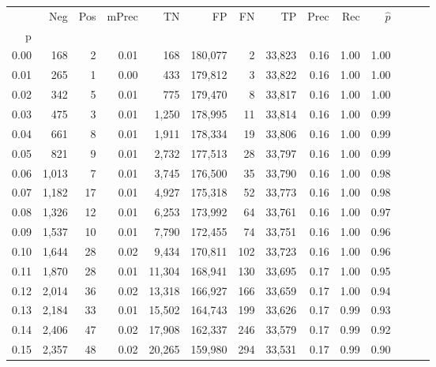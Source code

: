 \begin{tabular}{rrrrrrrrrrrrrr}
\toprule
{} &    Neg &  Pos & mPrec &       TN &       FP &      FN &      TP &  Prec &   Rec & $\hat{p}$ \\
p    &        &      &       &          &          &         &         &       &       &           \\
\midrule
0.00 &    168 &    2 &  0.01 &      168 &  180,077 &       2 &  33,823 &  0.16 &  1.00 &      1.00 \\
0.01 &    265 &    1 &  0.00 &      433 &  179,812 &       3 &  33,822 &  0.16 &  1.00 &      1.00 \\
0.02 &    342 &    5 &  0.01 &      775 &  179,470 &       8 &  33,817 &  0.16 &  1.00 &      1.00 \\
0.03 &    475 &    3 &  0.01 &    1,250 &  178,995 &      11 &  33,814 &  0.16 &  1.00 &      0.99 \\
0.04 &    661 &    8 &  0.01 &    1,911 &  178,334 &      19 &  33,806 &  0.16 &  1.00 &      0.99 \\
0.05 &    821 &    9 &  0.01 &    2,732 &  177,513 &      28 &  33,797 &  0.16 &  1.00 &      0.99 \\
0.06 &  1,013 &    7 &  0.01 &    3,745 &  176,500 &      35 &  33,790 &  0.16 &  1.00 &      0.98 \\
0.07 &  1,182 &   17 &  0.01 &    4,927 &  175,318 &      52 &  33,773 &  0.16 &  1.00 &      0.98 \\
0.08 &  1,326 &   12 &  0.01 &    6,253 &  173,992 &      64 &  33,761 &  0.16 &  1.00 &      0.97 \\
0.09 &  1,537 &   10 &  0.01 &    7,790 &  172,455 &      74 &  33,751 &  0.16 &  1.00 &      0.96 \\
0.10 &  1,644 &   28 &  0.02 &    9,434 &  170,811 &     102 &  33,723 &  0.16 &  1.00 &      0.96 \\
0.11 &  1,870 &   28 &  0.01 &   11,304 &  168,941 &     130 &  33,695 &  0.17 &  1.00 &      0.95 \\
0.12 &  2,014 &   36 &  0.02 &   13,318 &  166,927 &     166 &  33,659 &  0.17 &  1.00 &      0.94 \\
0.13 &  2,184 &   33 &  0.01 &   15,502 &  164,743 &     199 &  33,626 &  0.17 &  0.99 &      0.93 \\
0.14 &  2,406 &   47 &  0.02 &   17,908 &  162,337 &     246 &  33,579 &  0.17 &  0.99 &      0.92 \\
0.15 &  2,357 &   48 &  0.02 &   20,265 &  159,980 &     294 &  33,531 &  0.17 &  0.99 &      0.90 \\

\end{tabular}

